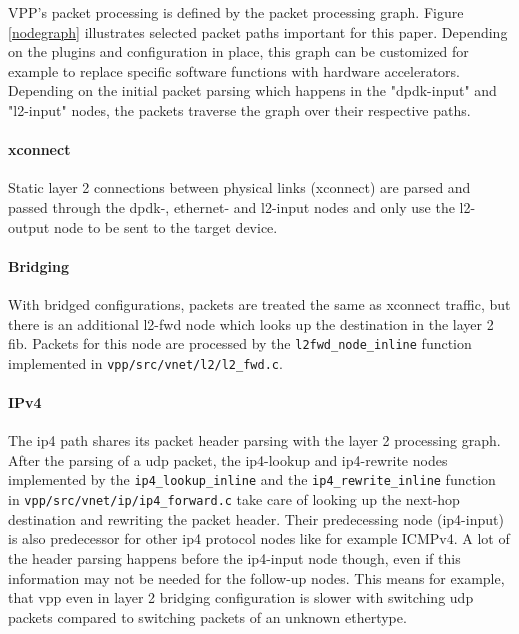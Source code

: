 
VPP's packet processing is defined by the packet processing graph.
Figure \ref{nodegraph} illustrates selected packet paths important for
this paper. Depending on the plugins and configuration in place, this
graph can be customized for example to replace specific software
functions with hardware accelerators. Depending on the initial packet
parsing which happens in the "dpdk-input" and "l2-input" nodes, the
packets traverse the graph over their respective paths.

\paragraph{xconnect}

Static layer 2 connections between physical links (xconnect) are
parsed and passed through the dpdk-, ethernet- and l2-input nodes and
only use the l2-output node to be sent to the target device.

\paragraph{Bridging}

With bridged configurations, packets are treated the same as xconnect
traffic, but there is an additional l2-fwd node which looks up the
destination in the layer 2 \Ac{fib}. Packets for this node are
processed by the \lstinline|l2fwd_node_inline| function implemented in
\lstinline|vpp/src/vnet/l2/l2_fwd.c|.

\paragraph{IPv4}
\label{sec:headerparsing} 

The \Ac{ip4} path shares its packet header parsing with the layer 2
processing graph. After the parsing of a \Ac{udp} packet, the
ip4-lookup and ip4-rewrite nodes implemented by the
\lstinline|ip4_lookup_inline| and the \lstinline|ip4_rewrite_inline|
function in \lstinline|vpp/src/vnet/ip/ip4_forward.c| take care of
looking up the next-hop destination and rewriting the packet header.
Their predecessing node (ip4-input) is also predecessor for other ip4
protocol nodes like for example ICMPv4. A lot of the header parsing
happens before the ip4-input node though, even if this information may
not be needed for the follow-up nodes. This means for example, that
\Ac{vpp} even in layer 2 bridging configuration is slower with
switching \Ac{udp} packets compared to switching packets of an unknown
ethertype.

